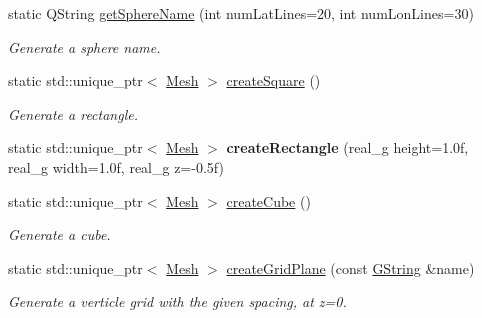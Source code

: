 \begin{Indent}
\begin{DoxyCompactItemize}
static Q\+String \mbox{\hyperlink{classrev_1_1_polygon_cache_af042c49e58f5e123cfcb76f098be3534}{get\+Sphere\+Name}} (int num\+Lat\+Lines=20, int num\+Lon\+Lines=30)
\begin{DoxyCompactList}\small\item\em Generate a sphere name. \end{DoxyCompactList}\item 
\mbox{\label{classrev_1_1_polygon_cache_af9ddd727f3d05583aac4f5e4f3a22a97}} 
static std\+::unique\+\_\+ptr$<$ \mbox{\hyperlink{classrev_1_1_mesh}{Mesh}} $>$ \mbox{\hyperlink{classrev_1_1_polygon_cache_af9ddd727f3d05583aac4f5e4f3a22a97}{create\+Square}} ()
\begin{DoxyCompactList}\small\item\em Generate a rectangle. \end{DoxyCompactList}\item 
\mbox{\label{classrev_1_1_polygon_cache_a9a749994d3fb76f6585c43322db14198}} 
static std\+::unique\+\_\+ptr$<$ \mbox{\hyperlink{classrev_1_1_mesh}{Mesh}} $>$ {\bfseries create\+Rectangle} (real\+\_\+g height=1.\+0f, real\+\_\+g width=1.\+0f, real\+\_\+g z=-\/0.\+5f)
\item 
static std\+::unique\+\_\+ptr$<$ \mbox{\hyperlink{classrev_1_1_mesh}{Mesh}} $>$ \mbox{\hyperlink{classrev_1_1_polygon_cache_aafe80ec3d7b68ae60fbcefae0ba71001}{create\+Cube}} ()
\begin{DoxyCompactList}\small\item\em Generate a cube. \end{DoxyCompactList}\item 
\mbox{\label{classrev_1_1_polygon_cache_a8cea9a29a2b0a9eee528cf2c60380066}} 
static std\+::unique\+\_\+ptr$<$ \mbox{\hyperlink{classrev_1_1_mesh}{Mesh}} $>$ \mbox{\hyperlink{classrev_1_1_polygon_cache_a8cea9a29a2b0a9eee528cf2c60380066}{create\+Grid\+Plane}} (const \mbox{\hyperlink{classrev_1_1_g_string}{G\+String}} \&name)
\begin{DoxyCompactList}\small\item\em Generate a verticle grid with the given spacing, at z=0. \end{DoxyCompactList}\item 
\mbox{\label{classrev_1_1_polygon_cache_aa53f194bb333d7432c075184f5f8379a}} 

\end{DoxyCompactItemize}
\end{Indent}
